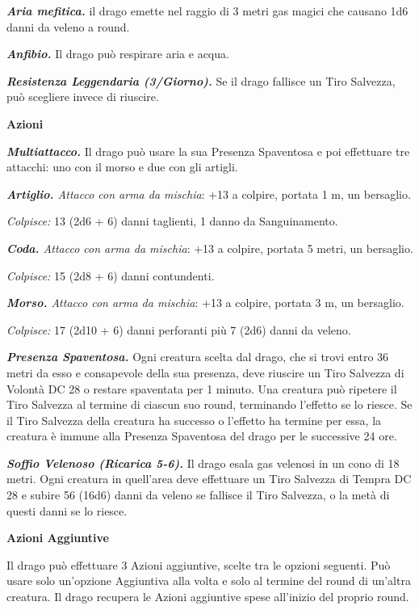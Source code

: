 \begin{multicols}{2}
{\emph{\textbf{Aria mefitica.}} il drago emette nel raggio di 3 metri gas magici che causano 1d6 danni da veleno a round.

\emph{\textbf{Anfibio.}} Il drago può respirare aria e acqua.

\emph{\textbf{Resistenza Leggendaria (3/Giorno).}} Se il drago fallisce un Tiro Salvezza, può scegliere invece di riuscire.

\textbf{Azioni}

\emph{\textbf{Multiattacco.}} Il drago può usare la sua Presenza Spaventosa e poi effettuare tre attacchi: uno con il morso e due con gli artigli.

\emph{\textbf{Artiglio.} Attacco con arma da mischia}: +13 a colpire, portata 1 m, un bersaglio.

\emph{Colpisce:} 13 (2d6 + 6) danni taglienti, 1 danno da Sanguinamento.

\emph{\textbf{Coda.} Attacco con arma da mischia}: +13 a colpire, portata 5 metri, un bersaglio.

\emph{Colpisce:} 15 (2d8 + 6) danni contundenti.

\emph{\textbf{Morso.} Attacco con arma da mischia}: +13 a colpire, portata 3 m, un bersaglio.

\emph{Colpisce:} 17 (2d10 + 6) danni perforanti più 7 (2d6) danni da veleno.

\emph{\textbf{Presenza Spaventosa.}} Ogni creatura scelta dal drago, che si trovi entro 36 metri da esso e consapevole della sua presenza, deve riuscire un Tiro Salvezza di Volontà DC 28 o restare spaventata per 1 minuto. Una creatura può ripetere il Tiro Salvezza al termine di ciascun suo round, terminando l'effetto se lo riesce. Se il Tiro Salvezza della creatura ha successo o l'effetto ha termine per essa, la creatura è immune alla Presenza Spaventosa del drago per le successive 24 ore.

\emph{\textbf{Soffio Velenoso (Ricarica 5-6).}} Il drago esala gas velenosi in un cono di 18 metri. Ogni creatura in quell'area deve effettuare un Tiro Salvezza di Tempra DC 28 e subire 56 (16d6) danni da veleno se fallisce il Tiro Salvezza, o la metà di questi danni se lo riesce.

\textbf{Azioni Aggiuntive}

Il drago può effettuare 3 Azioni aggiuntive, scelte tra le opzioni seguenti. Può usare solo un'opzione Aggiuntiva alla volta e solo al termine del round di un'altra creatura. Il drago recupera le Azioni aggiuntive spese all'inizio del proprio round.

}
\end{multicols}
